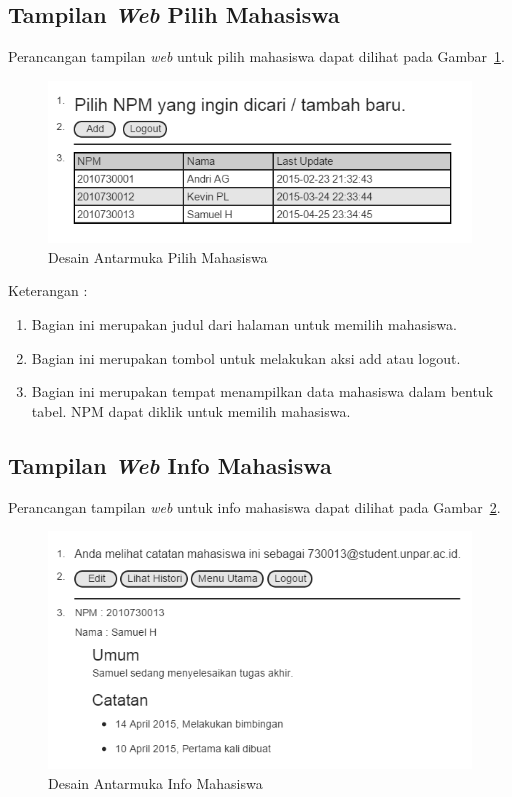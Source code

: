 \subsection{Tampilan {\it Web} Pilih Mahasiswa}
Perancangan tampilan {\it web} untuk pilih mahasiswa dapat dilihat pada
Gambar~\ref{fig:pilihmahasiswa}.

\begin{figure}[H]
\centering
\includegraphics[scale=0.5]{Gambar/pilihmahasiswa.png}
\caption[Desain Antarmuka Pilih Mahasiswa]{Desain Antarmuka Pilih Mahasiswa}
\label{fig:pilihmahasiswa}
\end{figure}

Keterangan :
\begin{enumerate}[(1)]
\item
Bagian ini merupakan judul dari halaman untuk memilih mahasiswa.
\item
Bagian ini merupakan tombol untuk melakukan aksi add atau logout.
\item
Bagian ini merupakan tempat menampilkan data mahasiswa dalam bentuk tabel. NPM
dapat diklik untuk memilih mahasiswa.
\end{enumerate}

\subsection{Tampilan {\it Web} Info Mahasiswa}
Perancangan tampilan {\it web} untuk info mahasiswa dapat dilihat pada Gambar~\ref{fig:infomahasiswa}.
\begin{figure}[H]
\centering
\includegraphics[scale=0.5]{Gambar/infomahasiswa.png}
\caption[Desain Antarmuka Info Mahasiswa]{Desain Antarmuka Info Mahasiswa}
\label{fig:infomahasiswa}
\end{figure}

